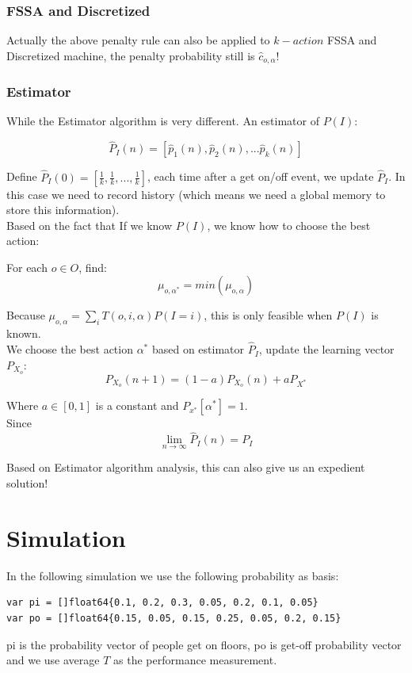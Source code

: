 \documentclass[11pt]{article}
\begin{document}
\subsubsection{FSSA and  Discretized}
Actually the above penalty rule can also be applied to $k-action$ FSSA and Discretized machine, the penalty probability still is $\hat{c}_{o,\alpha}$!

\subsubsection{Estimator}
While the Estimator algorithm is very different. An estimator of $P(I)$:

$$\hat{P}_I(n)=[\hat{p}_1(n),\hat{p}_2(n),...\hat{p}_k(n)]$$

Define $\hat{P}_I(0)=[\frac{1}{k},\frac{1}{k},...,\frac{1}{k}]$, each time after a get on/off event, we update $\hat{P}_I$. In this case we need to record history (which means we need a global memory to store this information).\\

Based on the fact that If we know $P(I)$, we know how to choose the best action:

For each $o \in O$, find:
$$\mu_{o,\alpha^*}=min(\mu_{o,\alpha})$$

Because $\mu_{o,\alpha} = \sum_iT(o,i,\alpha)P(I=i)$, this is only feasible when $P(I)$ is known.\\

We choose the best action $\alpha^*$ based on estimator $\hat{P}_I$, update the learning vector $P_{X_o}$:
$$P_{X_o}(n+1)=(1-a)P_{X_o}(n)+aP_{X^*}$$

Where $a\in [0,1]$ is a constant and $P_{x^*}[\alpha^*]=1$.\\

Since
$$\lim_{n\to \infty}\hat{P}_I(n)=P_I$$

Based on Estimator algorithm analysis, this can also give us an expedient solution!

\section{Simulation}
In the following simulation we use the following probability as basis:
\begin{verbatim}
var pi = []float64{0.1, 0.2, 0.3, 0.05, 0.2, 0.1, 0.05}
var po = []float64{0.15, 0.05, 0.15, 0.25, 0.05, 0.2, 0.15}
\end{verbatim}
pi is the probability vector of people get on floors, po is get-off probability vector and we use average $T$ as the performance measurement.
\end{document}
